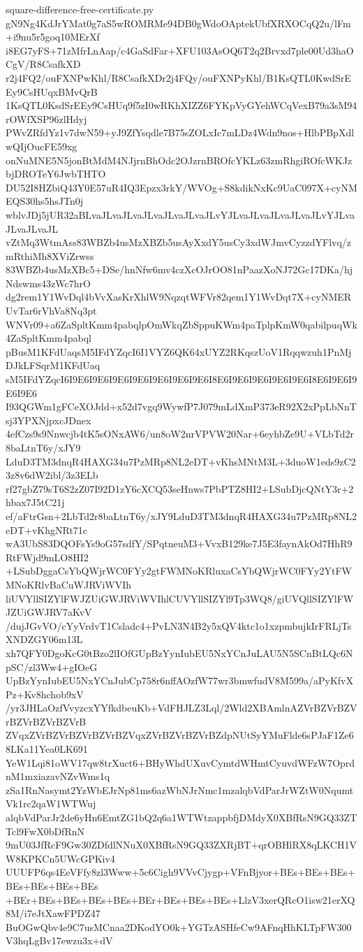 \documentclass[11pt]{article}
\theoremstyle{definition}
\theoremstyle{remark}
\begin{document}
\begin{filecontents*}[overwrite]{square-difference-free-certificate.py}
gN9Ng4KdJrYMat0g7aS5wROMRMe94DB0gWdoOAptekUbfXRXOCqQ2u/lFm+i9nu5r5goq10MErXf
i8EG7yFS+71zMfrLnAap/c4GaSdFar+XFU103AsOQ6T2q2Brvxd7ple00Ud3haOCgV/R8CsafkXD
r2j4FQ2/ouFXNPwKhl/R8CsafkXDr2j4FQy/ouFXNPyKhl/B1KsQTL0KwdSrEEy9CsHUqxBMvQrB
1KsQTL0KsdSrEEy9CsHUq9f5zI0wRKhXIZZ6FYKpVyGYehWCqVexB79a3sM94rOWfXSP96zlHdyj
PWvZRfdYz1v7dwN59+yJ9ZfYsqdle7B75sZOLxIc7mLDz4Wdn9nos+HlbPBpXdlwQIjOucFE59xg
onNuMNE5N5jonBtMdM4NJjrnBhOdc2OJzrnBROfcYKLz63zmRhgiROfcWKJzbjDROTeY6JwbTHTO
DU52I8HZbiQ43Y0E57uR4IQ3Epzx3rkY/WVOg+S8kdikNxKc9UaC097X+cyNMEQS30hs5hsJTn0j
wblvJDj5jUR32aBLvaJLvaJLvaJLvaJLvaJLvaJLvYJLvaJLvaJLvaJLvaJLvYJLvaJLvaJLvaJL
vZtMq3WtmAss83WBZb4usMzXBZb5usAyXxdY5usCy3xdWJmvCyzzdYFlvq/zmRthiMh8XViZrwss
83WBZb4usMzXBc5+DSe/hnNfw6mv4czXcOJrOO81nPaazXoNJ72Gc17DKa/hjNdswms43zWc7hrO
dg2rem1Y1WvDql4bVvXasKrXhlW9NqzqtWFVr82qem1Y1WvDqt7X+cyNMERUvTar6rVhVa8Nq3pt
WNVr09+a6ZaSpltKmm4pabqlpOmWkqZbSppuKWm4paTplpKmW0qabilpuqWk4ZaSpltKmm4pabql
pBusM1KFdUaqsM5IFdYZqcI6I1VYZ6QK64xUYZ2RKqszUoV1Rqqwzuh1PnMjDJkLFSqrM1KFdUaq
sM5IFdYZqcI6I9E6I9E6I9E6I9E6I9E6I9E6I9E6I8E6I9E6I9E6I9E6I9E6I8E6I9E6I9E6I9E6
I93QGWm1gFCeXOJdd+x52d7vgq9WywfP7J079mLdXmP373eR92X2xPpLbNnTsj3YPXNjpxcJDnex
4efCzs9s9Nnwcjb4tK5sONxAW6/un8oW2nrVPVW20Nar+6eyhbZe9U+VLbTd2r8baLtnT6y/xJY9
LduD3TM3dnqR4HAXG34u7PzMRp8NL2eDT+vKhsMNtM3L+3duoW1eds9zC23z8v6dW2ibl/3z3ELb
rf27gbZ79sT6S2zZ07I92D1zY6cXCQ53seHnws7PbPTZ8HI2+LSubDjcQNtY3r+2hbax7J5tC21j
ef/aFtrGsn+2LbTd2r8baLtnT6y/xJY9LduD3TM3dnqR4HAXG34u7PzMRp8NL2eDT+vKhgNRt71c
wA3UbS83DQOFsYs9oG57sdfY/SPqtneuM3+VvxB129ke7J5E3faynAkOd7HhR9RtFWjd9mLO8HI2
+LSubDggaCsYbQWjrWC0FYy2gtFWMNoKRluxaCsYbQWjrWC0FYy2YtFWMNoKRlvBaCuWJRViWVIh
liUVYllSIZYlFWJZUiGWJRViWVIhlCUVYllSIZYl9Tp3WQ8/giUVQllSIZYlFWJZUiGWJRV7aKvV
/dujJGvVO/cYyVrdvT1Csladc4+PvLN3N4B2y5xQV4ktc1o1xzpmbujkIrFRLjTsXNDZGY06m13L
xh7QFY0DgoKcG0tBzo2lIOfGUpBzYynIubEU5NxYCnJuLAU5N5SCnBtLQc6NpSC/zl3Ww4+gIOeG
UpBzYynIubEU5NxYCnJubCp758r6nffAOzfW77wr3bmwfudV8M599a/aPyKfvXPz+Kv8hchob9xV
/yr3JHLaOzfVvyzcxYYfkdbeuKb+VdFHJLZ3Lql/2Wld2XBAmlnAZVrBZVrBZVrBZVrBZVrBZVrB
ZVqxZVrBZVrBZVrBZVrBZVqxZVrBZVrBZVrBZdpNUtSyYMuFlde6sPJaF1Ze68LKa11Yea0LK691
YeW1Lqi81oWV17qw8trXuct6+BHyWhdUXuvCymtdWHmtCyuvdWFzW7OprdnM1mxiazavNZvWms1q
zSa1RnNasymt2YzWbEJrNp81ms6azWbNJrNmc1mzalqbVdParJrWZtW0NqumtVk1rc2qaW1WTWuj
alqbVdParJr2de6yHn6EmtZG1bQ2q6a1WTWtzappbfjDMdyX0XBfRsN9GQ33ZTTcl9FwX0bDfRnN
9mU03JfRcF9Gw30ZDfdlNNuX0XBfRsN9GQ33ZXRjBT+qrOBHlRX8qLKCH1VW8KPKCn5UWcGPKiv4
UUUFP6qs4EeVFfy8zl3Www+5c6Cigh9VVvCjygp+VFnBjyor+BEs+BEs+BEs+BEs+BEs+BEs+BEs
+BEr+BEs+BEs+BEs+BEs+BEr+BEs+BEs+BEs+LlzV3xerQRcO1isw21erXQ8M/i7eJtXawFPDZ47
BuOGwQbv4e9C7usMCnaa2DKodYO0k+YGTzASHfeCw9AFnqHhKLTpFW300V3hqLgBv17ewzu3x+dV

\end{filecontents*}
\end{document}
